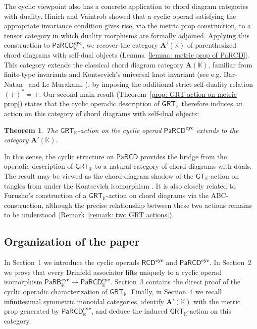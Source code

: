 \documentclass{amsart}
\newcommand{\bA}{\mathbf{A}}
\newcommand{\kk}{\mathbb{K}}    %
\newcommand{\PaRB}{\mathsf{PaRB}}
\newcommand{\PaRCD}{\mathsf{PaRCD}}
\newcommand{\RCD}{\mathsf{RCD}}
\newcommand{\hPaRB}{{\PaRB}_{\kk}}
\newcommand{\hPaRCD}{{\PaRCD}_{\kk}}
\newcommand{\cyc}{\mathbf{cyc}}
\newcommand{\GT}{{\mathsf{GT}}}
\newcommand{\GRT}{{\mathsf{GRT}}}
\newtheorem{Th}{Theorem}\renewcommand{\theTh}{\Alph{Th}}
\theoremstyle{definition}
\numberwithin{equation}{section}
\begin{document}
The cyclic viewpoint also has a concrete application to chord diagram categories with duality. Hinich and Vaintrob \cite{hv_cyclic} showed that a cyclic operad satisfying the appropriate invariance condition gives rise, via the metric prop construction, to a tensor category in which duality morphisms are formally adjoined. Applying this construction to $ \PaRCD^{\cyc}_{\kk} $, we recover the category $\mathbf{A}'(\kk)$ of parenthesized chord diagrams with self-dual objects (Lemma~\ref{lemma: metric prop of PaRCD}). This category extends the classical chord diagram category $ \mathbf{A}(\kk) $, familiar from finite-type invariants and Kontsevich's universal knot invariant (see e.g. Bar-Natan~\cite{bar-natan_fundamental_1997,bar-natan_wheels_1997} and Le Murakami \cite{Le_Murakami_1996}), by imposing the additional strict self-duality relation $ (+)^* = + $. Our second main result (Theorem~\ref{prop: GRT action on metric prop}) states that the cyclic operadic description of $ \GRT_{\kk} $ therefore induces an action on this category of chord diagrams with self-dual objects:

\begin{Th}
The $\GRT_{\kk}$-action on the cyclic operad $\PaRCD^{\cyc}$ extends to the category $\bA'(\kk)$.
\end{Th} 

In this sense, the cyclic structure on $ \PaRCD $ provides the bridge from the operadic description of $ \GRT_{\kk} $ to a natural category of chord-diagrams with duals. The result may be viewed as the chord-diagram shadow of the $\GT_{\kk}$-action on tangles from \cite{RS2025cyclicgt} under the Kontsevich isomorphism . It is also closely related to Furusho's construction \cite{furusho_galois_2020} of a $ \GRT_{\kk} $-action on chord diagrams via the ABC-construction, although the precise relationship between these two actions remains to be understood (Remark~\ref{remark: two GRT actions}).

\subsection*{Organization of the paper} In Section~1 we introduce the cyclic operads $ \RCD^{\cyc} $ and $ \PaRCD^{\cyc} $. In Section~2 we prove that every Drinfeld associator lifts uniquely to a cyclic operad isomorphism $ \hPaRB^{\cyc}\to \hPaRCD^{\cyc} $. Section~3 contains the direct proof of the cyclic operadic characterization of $ \GRT_{\kk} $. Finally, in Section~4 we recall infinitesimal symmetric monoidal categories, identify $ \mathbf{A}'(\kk) $ with the metric prop generated by $ \PaRCD^{\cyc}_{\kk} $, and deduce the induced $ \GRT_{\kk} $-action on this category.
\end{document}
